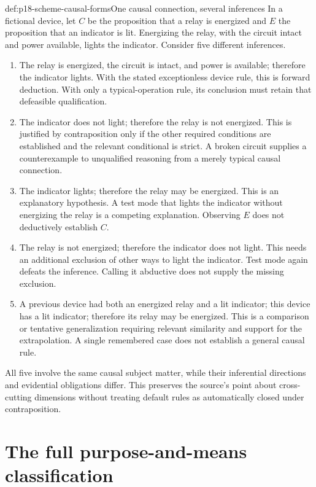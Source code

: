 \begin{hbexample}{def:p18-scheme-causal-forms}{One causal connection, several inferences}
In a fictional device, let \(C\) be the proposition that a relay
is energized and \(E\) the proposition that an indicator is lit.
Energizing the relay, with the circuit intact and power available,
lights the indicator.
Consider five different inferences.
\begin{enumerate}
\item The relay is energized, the circuit is intact, and power is
available; therefore the indicator lights. With the stated exceptionless
device rule, this is forward deduction. With only a typical-operation
rule, its conclusion must retain that defeasible qualification.
\item The indicator does not light; therefore the relay is not energized.
This is justified by contraposition only if the other required
conditions are established and the relevant conditional is strict.
A broken circuit supplies a counterexample to unqualified reasoning
from a merely typical causal connection.
\item The indicator lights; therefore the relay may be energized.
This is an explanatory hypothesis. A test mode that lights the indicator
without energizing the relay is a competing explanation. Observing \(E\)
does not deductively establish \(C\).
\item The relay is not energized; therefore the indicator does not light.
This needs an additional exclusion of other ways to light the indicator.
Test mode again defeats the inference. Calling it abductive does not
supply the missing exclusion.
\item A previous device had both an energized relay and a lit indicator;
this device has a lit indicator; therefore its relay may be energized.
This is a comparison or tentative generalization requiring relevant
similarity and support for the extrapolation. A single remembered
case does not establish a general causal rule.
\end{enumerate}
All five involve the same causal subject matter, while their inferential
directions and evidential obligations differ. This preserves the source's
point about cross-cutting dimensions without treating default rules
as automatically closed under contraposition.
\end{hbexample}

\section{The full purpose-and-means classification}
\label{sec:p18-scheme-purpose-tree}

